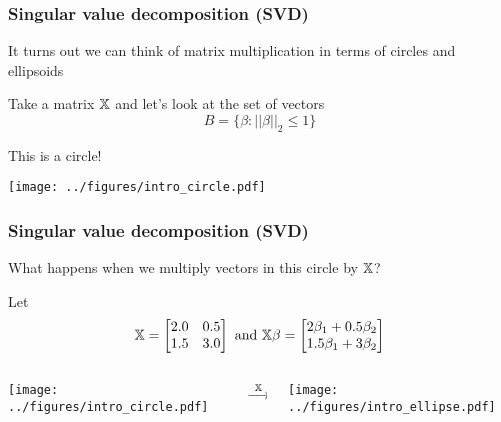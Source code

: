 \documentclass{beamer}
\begin{document}
\begin{frame}
\frametitle{Singular value decomposition (SVD)}
It turns out we can think of matrix multiplication in terms of circles and ellipsoids

\vsp
Take a matrix $\mathbb{X}$ and let's look at the set of vectors 
\[
B = \{ \beta: ||\beta||_2 \leq 1\}
\]

\vsp
This is a circle!
\begin{center}
\texttt{[image: ../figures/intro\_circle.pdf]}
\end{center}
\end{frame}

\begin{frame}
\frametitle{Singular value decomposition (SVD)}
What happens when we multiply vectors in this circle by  $\mathbb{X}$?

\vsp

Let 
\[
\mathbb{X} = 
\begin{bmatrix}
2.0 & 0.5 \\
1.5 & 3.0 
\end{bmatrix}
\textrm{ and } 
\mathbb{X} \beta
=
\begin{bmatrix}
2\beta_1 + 0.5\beta_2 \\
1.5\beta_1 +3\beta_2 
\end{bmatrix}
\]
\begin{columns}[T]
    \begin{column}{.38\textwidth}
\texttt{[image: ../figures/intro\_circle.pdf]}
\end{column}
    \begin{column}{.05\textwidth}
    \vsp
    
    \vsp
    
    \vsp
    
    \vsp
    
    \vsp
\[
\stackrel{\mathbb{X}}{\longrightarrow}
\]
\end{column}
    \begin{column}{.37\textwidth}
\texttt{[image: ../figures/intro\_ellipse.pdf]}
\end{column}
\end{columns}
\end{frame}
\end{document}
